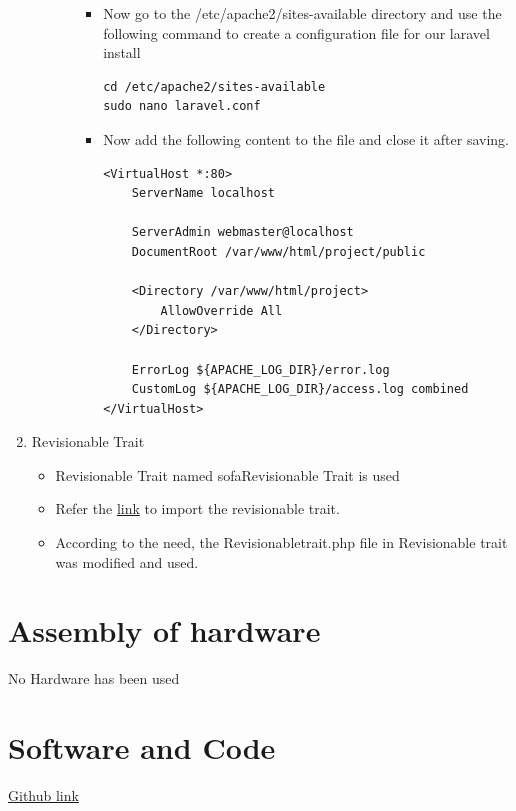 \documentclass[a4paper,12pt,oneside]{book}
\begin{document}
\begin{enumerate}
\begin{itemize}
\begin{enumerate}
\begin{itemize}
							\item Now go to the /etc/apache2/sites-available directory and use the following command to create a configuration file for our laravel install 
							    \begin{verbatim}
cd /etc/apache2/sites-available
sudo nano laravel.conf
							    \end{verbatim}
							
							\item Now add the following content to the file and close it after saving.\begin{verbatim}
<VirtualHost *:80>
    ServerName localhost

    ServerAdmin webmaster@localhost
    DocumentRoot /var/www/html/project/public

    <Directory /var/www/html/project>
        AllowOverride All
    </Directory>

    ErrorLog ${APACHE_LOG_DIR}/error.log
    CustomLog ${APACHE_LOG_DIR}/access.log combined
</VirtualHost>
							      \end{verbatim}
  						\end{itemize}
  						
				\end{enumerate}  				 
  
  		\end{itemize}
  		
    \item Revisionable Trait
        \begin{itemize}
            \item Revisionable Trait named sofaRevisionable Trait is used
            \item Refer the 
                {\href{https://github.com/jarektkaczyk/revisionable}{link}}
                 to import the revisionable trait.
            \item According to the need, the Revisionabletrait.php file in Revisionable trait was modified and used.
        \end{itemize}
\end{enumerate}

\vspace{2in}

\section{Assembly of hardware}
No Hardware has been used

\section{Software and Code}
\href{http://www.github.com}{Github link}
\end{document}
